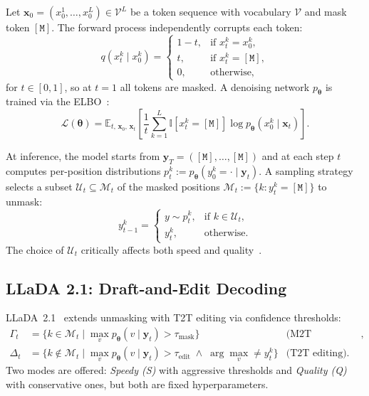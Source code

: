 \documentclass[11pt]{article}
\newcommand{\E}{\mathbb{E}}
\newcommand{\cM}{\mathcal{M}}
\newcommand{\cU}{\mathcal{U}}
\newcommand{\cV}{\mathcal{V}}
\newcommand{\cL}{\mathcal{L}}
\newcommand{\btheta}{\bm{\theta}}
\newcommand{\bx}{\mathbf{x}}
\newcommand{\by}{\mathbf{y}}
\newcommand{\ind}{\mathbb{I}}
\newcommand{\mask}{\ensuremath{\mathtt{[M]}}}
\begin{document}
Let $\bx_0 = (x_0^1, \dots, x_0^L) \in \cV^L$ be a token sequence with vocabulary $\cV$ and mask token $\mask$.
The forward process independently corrupts each token:
\begin{equation}
    q(x_t^k \mid x_0^k) = \begin{cases}
        1 - t, & \text{if } x_t^k = x_0^k, \\
        t, & \text{if } x_t^k = \mask, \\
        0, & \text{otherwise,}
    \end{cases}
    \label{eq:forward}
\end{equation}
for $t \in [0, 1]$, so at $t{=}1$ all tokens are masked.
A denoising network $p_{\btheta}$ is trained via the ELBO~\cite{ou2024your,sahoo2024simple}:
\begin{equation}
    \cL(\btheta) = \E_{t,\, \bx_0,\, \bx_t} \left[ \frac{1}{t} \sum_{k=1}^L \ind[x_t^k = \mask] \log p_{\btheta}(x_0^k \mid \bx_t) \right].
    \label{eq:elbo}
\end{equation}

At inference, the model starts from $\by_T = (\mask, \dots, \mask)$ and at each step $t$ computes per-position distributions $p_t^k := p_{\btheta}(y_0^k {=} \cdot \mid \by_t)$.
A sampling strategy selects a subset $\cU_t \subseteq \cM_t$ of the masked positions $\cM_t := \{k : y_t^k = \mask\}$ to unmask:
\begin{equation}
    y_{t-1}^k = \begin{cases}
        y \sim p_t^k, & \text{if } k \in \cU_t, \\
        y_t^k, & \text{otherwise.}
    \end{cases}
    \label{eq:sampling}
\end{equation}
The choice of $\cU_t$ critically affects both speed and quality~\cite{jazbec2025learning,wu2025fastdllm}.

\subsection{LLaDA 2.1: Draft-and-Edit Decoding}
\label{sec:bg_llada}

LLaDA~2.1~\cite{llada21} extends unmasking with T2T editing via confidence thresholds:
\begin{align}
    \Gamma_t &= \bigl\{ k \in \cM_t \;\big|\; \max_v p_{\btheta}(v \mid \by_t) > \tau_{\text{mask}} \bigr\} & \text{(M2T unmasking)}, \label{eq:gamma} \\
    \Delta_t &= \bigl\{ k \notin \cM_t \;\big|\; \max_v p_{\btheta}(v \mid \by_t) > \tau_{\text{edit}} \;\land\; \arg\max_v \neq y_t^k \bigr\} & \text{(T2T editing)}. \label{eq:delta}
\end{align}
Two modes are offered: \emph{Speedy (S)} with aggressive thresholds and \emph{Quality (Q)} with conservative ones, but both are fixed hyperparameters.
\end{document}
